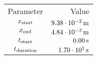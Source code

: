\begin{tabular}{cr}
    \toprule
    Parameter & Value \\ \otoprule
    $x_{\textup{start}}$    & $\unit[9.38 \cdot 10^{-2}]{m}$ \\
    $x_{\textup{end}}$      & $\unit[4.84 \cdot 10^{-3}]{m}$ \\
    $t_{\textup{start}}$    & $\unit[0.00]{s}$ \\
    $t_{\textup{duration}}$ & $\unit[1.70 \cdot 10^{1}]{s}$ \\
    \bottomrule
\end{tabular}
